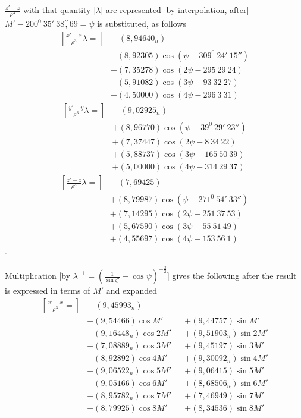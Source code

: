 \(\frac{z'-z}{\rho^3}\) with that quantity [\(\lambda\)] are represented [by
interpolation, after] \(M'-200^0\ 35'\ 38\overset{\prime\prime}{,}69=\psi\)
is substituted, as follows
\[
\begin{aligned}
{\left[\frac{x'-x}{\rho^3}\lambda=\right]}&\quad(8{,}94640_n)\\
&+(8{,}92305)\cos(\psi-309^0\ 24'\ 15'')\\
&+(7{,}35278)\cos(2\psi-295\ 29\ 24)\\
&+(5{,}91082)\cos(3\psi-93\ 32\ 27)\\
&+(4{,}50000)\cos(4\psi-296\ 3\ 31)
\end{aligned}
\]
\[
\begin{aligned}
{\left[\frac{y'-y}{\rho^3}\lambda=\right]}&\quad(9{,}02925_n)\\
&+(8{,}96770)\cos(\psi-39^0\ 29'\ 23'')\\
&+(7{,}37447)\cos(2\psi-8\ 34\ 22)\\
&+(5{,}88737)\cos(3\psi-165\ 50\ 39)\\
&+(5{,}00000)\cos(4\psi-314\ 29\ 37)
\end{aligned}
\]
\[
\begin{aligned}
{\left[\frac{z'-z}{\rho^3}\lambda=\right]}&\quad(7{,}69425)\\
&+(8{,}79987)\cos(\psi-271^0\ 54'\ 33'')\\
&+(7{,}14295)\cos(2\psi-251\ 37\ 53)\\
&+(5{,}67590)\cos(3\psi-55\ 51\ 49)\\
&+(4{,}55697)\cos(4\psi-153\ 56\ 1)
\end{aligned}
\]
.
\par\noindent\hspace*{\parindent}Multiplication [by
\(\lambda^{-1}=\left(\frac1{\sin\zeta'}-\cos\psi\right)^{-\frac32}\)] gives the following
after the result is expressed in terms of \(M'\) and expanded
\[
\begin{aligned}
{\left[\frac{x'-x}{\rho^3}=\right]}&\quad(9{,}45993_n)\\
&+(9{,}54466)\cos M'       &&+(9{,}44757)\sin M'\\
&+(9{,}16448_n)\cos2M'    &&+(9{,}51903_n)\sin2M'\\
&+(7{,}08889_n)\cos3M'    &&+(9{,}45197)\sin3M'\\
&+(8{,}92892)\cos4M'      &&+(9{,}30092_n)\sin4M'\\
&+(9{,}06522_n)\cos5M'    &&+(9{,}06415)\sin5M'\\
&+(9{,}05166)\cos6M'      &&+(8{,}68506_n)\sin6M'\\
&+(8{,}95782_n)\cos7M'    &&+(7{,}46949)\sin7M'\\
&+(8{,}79925)\cos8M'      &&+(8{,}34536)\sin8M'
\end{aligned}
\]
